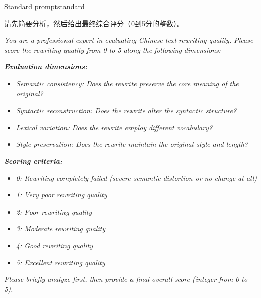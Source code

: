 \documentclass[11pt]{article}
\begin{document}
\begin{table}[h!]
\begin{prompttextbox}{Standard prompt}{standard}
\begin{minipage}[t]{0.47\linewidth}
\medskip
请先简要分析，然后给出最终综合评分（0到5分的整数）。
\end{minipage}%
\hfill\vrule\hfill%
\begin{minipage}[t]{0.47\linewidth}
\textit{You are a professional expert in evaluating Chinese text rewriting quality. Please score the rewriting quality from 0 to 5 along the following dimensions:}

\medskip\textit{\textbf{Evaluation dimensions:}}
\begin{itemize}[leftmargin=1.2em,itemsep=0pt,topsep=2pt]
  \item \textit{Semantic consistency: Does the rewrite preserve the core meaning of the original?}
  \item \textit{Syntactic reconstruction: Does the rewrite alter the syntactic structure?}
  \item \textit{Lexical variation: Does the rewrite employ different vocabulary?}
  \item \textit{Style preservation: Does the rewrite maintain the original style and length?}
\end{itemize}

\medskip\textit{\textbf{Scoring criteria:}}
\begin{itemize}[leftmargin=1.2em,itemsep=0pt,topsep=2pt]
  \item \textit{0: Rewriting completely failed (severe semantic distortion or no change at all)}
  \item \textit{1: Very poor rewriting quality}
  \item \textit{2: Poor rewriting quality}
  \item \textit{3: Moderate rewriting quality}
  \item \textit{4: Good rewriting quality}
  \item \textit{5: Excellent rewriting quality}
\end{itemize}

\medskip\textit{Please briefly analyze first, then provide a final overall score (integer from 0 to 5).}
\end{minipage}
\end{prompttextbox}
\end{table}
\end{document}
